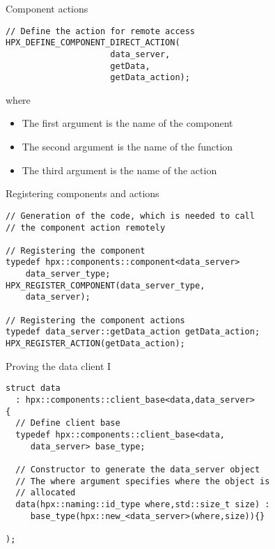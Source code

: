\documentclass[12pt,t]{beamer}
\begin{document}
\begin{frame}[fragile]{Component actions}

\begin{lstlisting}
// Define the action for remote access
HPX_DEFINE_COMPONENT_DIRECT_ACTION(
                     data_server,
                     getData,
                     getData_action);
\end{lstlisting}
where
\begin{itemize}
\item The first argument is the name of the component
\item The second argument is the name of the function
\item The third argument is the name of the action
\end{itemize}
\end{frame}

\begin{frame}[fragile]{Registering components and actions}

\begin{lstlisting}
// Generation of the code, which is needed to call 
// the component action remotely

// Registering the component
typedef hpx::components::component<data_server> 
    data_server_type;
HPX_REGISTER_COMPONENT(data_server_type, 
    data_server);
    
// Registering the component actions
typedef data_server::getData_action getData_action;
HPX_REGISTER_ACTION(getData_action);
\end{lstlisting}

\end{frame}

\begin{frame}[fragile]{Proving the data client I}

\begin{lstlisting}
struct data
  : hpx::components::client_base<data,data_server>
{
  // Define client base
  typedef hpx::components::client_base<data, 
     data_server> base_type;
  
  // Constructor to generate the data_server object
  // The where argument specifies where the object is
  // allocated
  data(hpx::naming::id_type where,std::size_t size) :
     base_type(hpx::new_<data_server>(where,size)){}
        
);
\end{lstlisting}

\end{frame}
\end{document}
